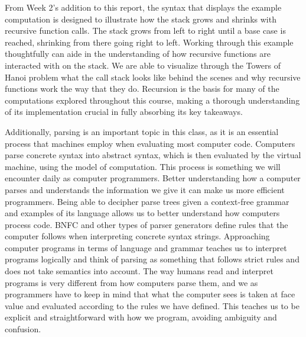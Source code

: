 \documentclass{article}
\theoremstyle{theorem}
\theoremstyle{definition}
\theoremstyle{remark}
\begin{document}
From Week 2's addition to this report, the syntax that displays the example computation is designed to illustrate how the stack grows and shrinks with recursive function calls. The stack grows from left to right until a base case is reached, shrinking from there going right to left. Working through this example thoughtfully can aide in the understanding of how recursive functions are interacted with on the stack. We are able to visualize through the Towers of Hanoi problem what the call stack looks like behind the scenes and why recursive functions work the way that they do. Recursion is the basis for many of the computations explored throughout this course, making a thorough understanding of its implementation crucial in fully absorbing its key takeaways. 

Additionally, parsing is an important topic in this class, as it is an essential process that machines employ when evaluating most computer code. Computers parse concrete syntax into abstract syntax, which is then evaluated by the virtual machine, using the model of computation. This process is something we will encounter daily as computer programmers. Better understanding how a computer parses and understands the information we give it can make us more efficient programmers. Being able to decipher parse trees given a context-free grammar and examples of its language allows us to better understand how computers process code. BNFC and other types of parser generators define rules that the computer follows when interpreting concrete syntax strings. Approaching computer programs in terms of language and grammar teaches us to interpret programs logically and think of parsing as something that follows strict rules and does not take semantics into account. The way humans read and interpret programs is very different from how computers parse them, and we as programmers have to keep in mind that what the computer sees is taken at face value and evaluated according to the rules we have defined. This teaches us to be explicit and straightforward with how we program, avoiding ambiguity and confusion.
\end{document}
